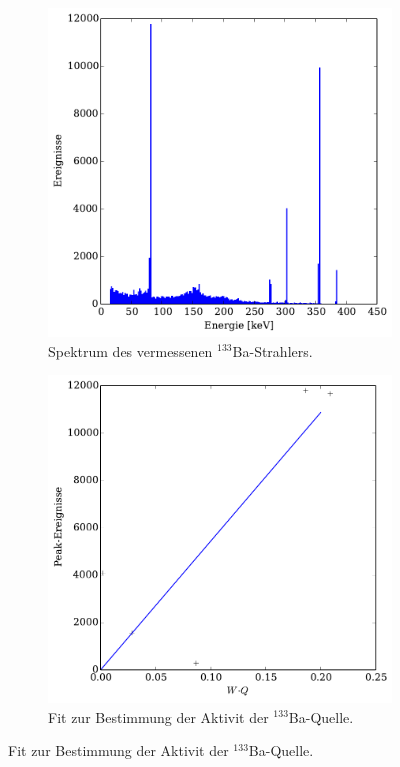 \begin{figure}
    \centering
    \begin{subfigure}{0.49\linewidth}
        \includegraphics[width=1.\linewidth]{img/07_barium.pdf}
        \caption{
            Spektrum des vermessenen $^{133}$Ba-Strahlers.
        }
        \label{fig:ba_spektrum}
    \end{subfigure}
    \begin{subfigure}{0.49\linewidth}
        \includegraphics[width=1.\linewidth]{img/07_barium_activity.pdf}
        \caption{
            Fit zur Bestimmung der Aktivit der $^{133}$Ba-Quelle.
        }
        \label{fig:barium_aktivitaet}
    \end{subfigure}
\end{figure}
